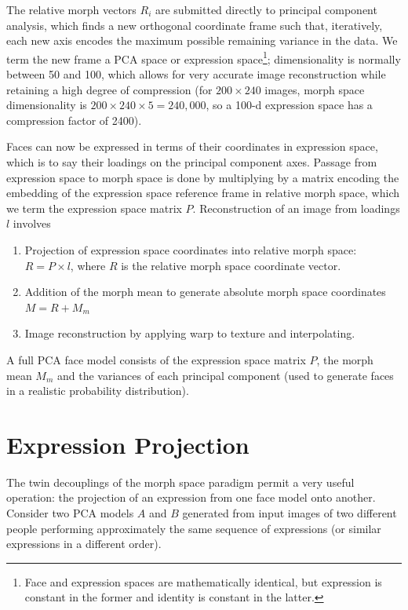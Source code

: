 \documentclass[runningheads]{llncs}
\begin{document}
The relative morph vectors $R_i$ are submitted directly to principal component analysis, which finds a new orthogonal coordinate frame such that, iteratively, each new axis encodes the maximum possible remaining variance in the data. We term the new frame a PCA space or expression space\footnote{Face and expression spaces are mathematically identical, but expression is constant in the former and identity is constant in the latter.}; dimensionality is normally between 50 and 100, which allows for very accurate image reconstruction while retaining a high degree of compression (for $200 \times 240$ images, morph space dimensionality is $200 \times 240 \times 5 = 240,000$, so a 100-d expression space has a compression factor of 2400).

Faces can now be expressed in terms of their coordinates in expression space, which is to say their loadings on the principal component axes. Passage from expression space to morph space is done by multiplying by a matrix encoding the embedding of the expression space reference frame in relative morph space, which we term the expression space matrix $P$. Reconstruction of an image from loadings $l$ involves

\begin{enumerate}
\item	Projection of expression space coordinates into relative morph space: $R = P \times l$, where $R$ is the relative morph space coordinate vector.
\item	Addition of the morph mean to generate absolute morph space coordinates $M = R + M_m$
\item	Image reconstruction by applying warp to texture and interpolating.
\end{enumerate}

A full PCA face model consists of the expression space matrix $P$, the morph mean $M_m$ and the variances of each principal component (used to generate faces in a realistic probability distribution).



\section{Expression Projection}

The twin decouplings of the morph space paradigm permit a very useful operation: the projection of an expression from one face model onto another. Consider two PCA models $A$ and $B$ generated from input images of two different people performing approximately the same sequence of expressions (or similar expressions in a different order).
\end{document}
